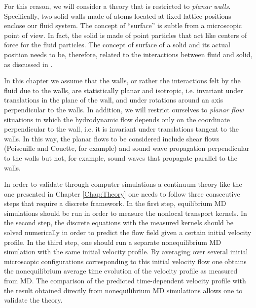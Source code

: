 \documentclass[b5paper,openright,10pt]{book}
\begin{document}
For  this reason,  we will  consider a  theory that  is restricted  to
\textit{planar walls}. Specifically, two solid walls made of atoms located at fixed lattice positions enclose our fluid system. The concept of  ``surface'' is subtle  from a
microscopic  point of  view.   In fact,  the solid  is  made of  point
particles that act like centers of  force for the fluid particles. The
concept of  surface of a  solid and its  actual position needs  to be,
therefore, related  to the  interactions between  fluid and  solid, as
discussed in \cite{CamargoBC2018}.

In this chapter we assume that the walls, or rather the interactions felt
by the fluid due to the  walls, are statistically planar and isotropic,
i.e.  invariant under translations in the plane of the wall, and under
rotations around an axis perpendicular to the walls.
In  addition,  we  will  restrict ourselves  to  \textit{planar  flow}
situations  in  which  the  hydrodynamic  flow  depends  only  on  the
coordinate  perpendicular to  the wall,  i.e.  it  is invariant  under
translations tangent to the walls.
In  this way,  the planar  flows  to be considered
include shear  flows (Poiseuille and  Couette, for example)  and sound
wave  propagation perpendicular  to the  walls but  not, for  example,
sound waves that propagate parallel to the walls.

In order to  validate through computer simulations  a continuum theory
like the one presented in Chapter  \ref{Chap:Theory} one needs to follow
three consecutive  steps that  require a  discrete framework.   In the
first  step, equilibrium  MD simulations  should  be run  in order  to
measure  the nonlocal  transport kernels.   In the  second step,  the
discrete  equations  with  the   measured  kernels  should  be  solved
numerically in order to predict the flow field given a certain initial
velocity  profile.  In  the  third  step, one  should  run a  separate
nonequilibrium MD simulation with  the same initial velocity profile.
By   averaging  over   several   initial  microscopic   configurations
corresponding  to   this  initial   velocity  flow  one   obtains  the
nonequilibrium  average time  evolution  of the  velocity profile  as
measured  from MD.   The  comparison of  the predicted  time-dependent
velocity   profile   with   the    result   obtained   directly   from
nonequilibrium MD simulations allows one to validate the theory.
\end{document}
